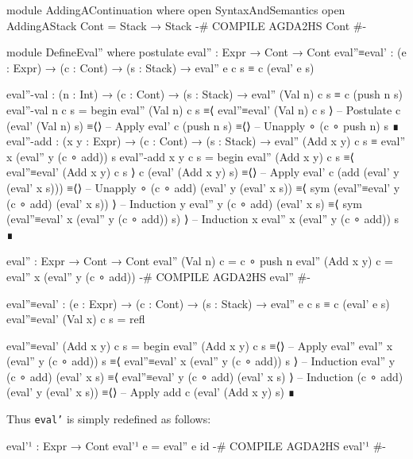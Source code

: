 \documentclass{article}
\begin{document}
\begin{code}
module AddingAContinuation where
  open SyntaxAndSemantics
  open AddingAStack
  Cont = Stack → Stack
  {-# COMPILE AGDA2HS Cont #-}

  module DefineEval'' where
    postulate
      eval'' : Expr → Cont → Cont
      eval''≡eval' : (e : Expr) → (c : Cont) → (s : Stack)
        → eval'' e c s ≡ c (eval' e s)

    eval''-val : (n : Int) → (c : Cont) → (s : Stack)
      → eval'' (Val n) c s ≡ c (push n s)
    eval''-val n c s =
      begin
        eval'' (Val n) c s
      ≡⟨ eval''≡eval' (Val n) c s ⟩ -- Postulate
        c (eval' (Val n) s)
      ≡⟨⟩ -- Apply eval'
        c (push n s)
      ≡⟨⟩ -- Unapply ∘
        (c ∘ push n) s
      ∎
    eval''-add : (x y : Expr) → (c : Cont) → (s : Stack)
      → eval'' (Add x y) c s ≡ eval'' x (eval'' y (c ∘ add)) s
    eval''-add x y c s =
      begin
        eval'' (Add x y) c s
      ≡⟨ eval''≡eval' (Add x y) c s ⟩
        c (eval' (Add x y) s)
      ≡⟨⟩ -- Apply eval'
        c (add (eval' y (eval' x s)))
      ≡⟨⟩ -- Unapply ∘
        (c ∘ add) (eval' y (eval' x s))
      ≡⟨ sym (eval''≡eval' y (c ∘ add) (eval' x s)) ⟩ -- Induction y
        eval'' y (c ∘ add) (eval' x s)
      ≡⟨ sym (eval''≡eval' x (eval'' y (c ∘ add)) s) ⟩ -- Induction x
        eval'' x (eval'' y (c ∘ add)) s
      ∎
\end{code}
\begin{code}
  eval'' : Expr → Cont → Cont
  eval'' (Val n) c = c ∘ push n
  eval'' (Add x y) c = eval'' x (eval'' y (c ∘ add))
  {-# COMPILE AGDA2HS eval'' #-}
\end{code}
\begin{code}
  eval''≡eval' : (e : Expr) → (c : Cont) → (s : Stack)
    → eval'' e c s ≡ c (eval' e s)
  eval''≡eval' (Val x) c s = refl
\end{code}
\begin{code}
  eval''≡eval' (Add x y) c s =
    begin
      eval'' (Add x y) c s
    ≡⟨⟩ -- Apply eval''
      eval'' x (eval'' y (c ∘ add)) s
    ≡⟨ eval''≡eval' x (eval'' y (c ∘ add)) s ⟩ -- Induction
      eval'' y (c ∘ add) (eval' x s)
    ≡⟨ eval''≡eval' y (c ∘ add) (eval' x s) ⟩ -- Induction
      (c ∘ add) (eval' y (eval' x s))
    ≡⟨⟩ -- Apply add
      c (eval' (Add x y) s)
    ∎
\end{code}

\noindent
Thus \texttt{eval'} is simply redefined as follows:

\begin{code}
  eval'¹ : Expr → Cont
  eval'¹ e = eval'' e id
  {-# COMPILE AGDA2HS eval'¹ #-}
\end{code}
\end{document}
